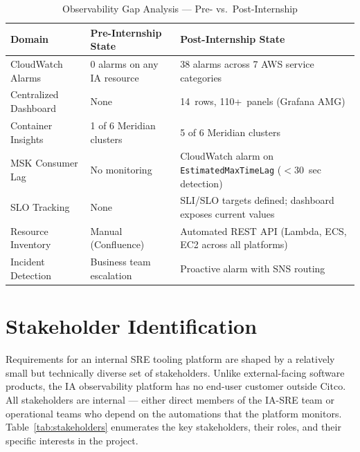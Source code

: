 \begin{table}[ht]
\centering
\caption{Observability Gap Analysis --- Pre- vs.\ Post-Internship}
\label{tab:gap_analysis}
\begin{tabular}{p{3.5cm}p{4.5cm}p{4.5cm}}
\toprule
\textbf{Domain} & \textbf{Pre-Internship State} & \textbf{Post-Internship State} \\
\midrule
CloudWatch Alarms & 0 alarms on any IA resource & 38 alarms across 7 AWS service categories \\
\midrule
Centralized Dashboard & None & 14~rows, 110+~panels (Grafana AMG) \\
\midrule
Container Insights & 1 of 6 Meridian clusters & 5 of 6 Meridian clusters \\
\midrule
MSK Consumer Lag & No monitoring & CloudWatch alarm on \texttt{EstimatedMaxTimeLag} ($<$30~sec detection) \\
\midrule
SLO Tracking & None & SLI/SLO targets defined; dashboard exposes current values \\
\midrule
Resource Inventory & Manual (Confluence) & Automated REST API (Lambda, ECS, EC2 across all platforms) \\
\midrule
Incident Detection & Business team escalation & Proactive alarm with SNS routing \\
\bottomrule
\end{tabular}
\end{table}

\section{Stakeholder Identification}
\label{sec:stakeholders}

Requirements for an internal SRE tooling platform are shaped by a
relatively small but technically diverse set of stakeholders.
Unlike external-facing software products, the IA observability
platform has no end-user customer outside Citco. All stakeholders
are internal --- either direct members of the IA-SRE team or
operational teams who depend on the automations that the platform
monitors. Table~\ref{tab:stakeholders} enumerates the key
stakeholders, their roles, and their specific interests in the
project.

